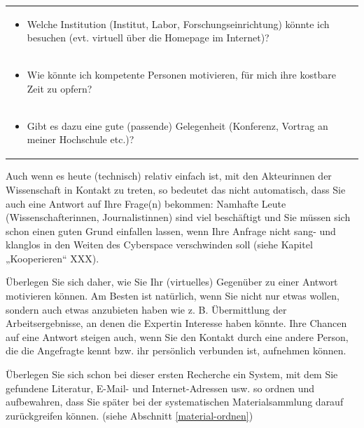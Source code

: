 \documentclass[]{book}
\providecommand{\tightlist}{%
  \setlength{\itemsep}{0pt}\setlength{\parskip}{0pt}}
\theoremstyle{definition}
\theoremstyle{definition}
\theoremstyle{definition}
\theoremstyle{remark}
\begin{document}
\begin{longtable}[]{@{}l@{}}
\begin{minipage}[t]{0.97\columnwidth}\raggedright\strut
\begin{itemize}
\tightlist
\item
  Welche Institution (Institut, Labor, Forschungseinrichtung) könnte ich
  besuchen (evt. virtuell über die Homepage im Internet)?
\end{itemize}\strut
\end{minipage}\tabularnewline
\begin{minipage}[t]{0.97\columnwidth}\raggedright\strut
\begin{itemize}
\tightlist
\item
  Wie könnte ich kompetente Personen motivieren, für mich ihre kostbare
  Zeit zu opfern?
\end{itemize}\strut
\end{minipage}\tabularnewline
\begin{minipage}[t]{0.97\columnwidth}\raggedright\strut
\begin{itemize}
\tightlist
\item
  Gibt es dazu eine gute (passende) Gelegenheit (Konferenz, Vortrag an
  meiner Hochschule etc.)?
\end{itemize}\strut
\end{minipage}\tabularnewline
\bottomrule
\end{longtable}

Auch wenn es heute (technisch) relativ einfach ist, mit den Akteurinnen
der Wissenschaft in Kontakt zu treten, so bedeutet das nicht
automatisch, dass Sie auch eine Antwort auf Ihre Frage(n) bekommen:
Namhafte Leute (Wissenschafterinnen, Journalistinnen) sind viel
beschäftigt und Sie müssen sich schon einen guten Grund einfallen
lassen, wenn Ihre Anfrage nicht sang- und klanglos in den Weiten des
Cyberspace verschwinden soll (siehe Kapitel „Kooperieren`` XXX).

Überlegen Sie sich daher, wie Sie Ihr (virtuelles) Gegenüber zu einer
Antwort motivieren können. Am Besten ist natürlich, wenn Sie nicht nur
etwas wollen, sondern auch etwas anzubieten haben wie z. B. Übermittlung
der Arbeitsergebnisse, an denen die Expertin Interesse haben könnte.
Ihre Chancen auf eine Antwort steigen auch, wenn Sie den Kontakt durch
eine andere Person, die die Angefragte kennt bzw. ihr persönlich
verbunden ist, aufnehmen können.

Überlegen Sie sich schon bei dieser ersten Recherche ein System, mit dem
Sie gefundene Literatur, E-Mail- und Internet-Adressen usw. so ordnen
und aufbewahren, dass Sie später bei der systematischen Materialsammlung
darauf zurückgreifen können. (siehe Abschnitt \ref{material-ordnen})
\end{document}
